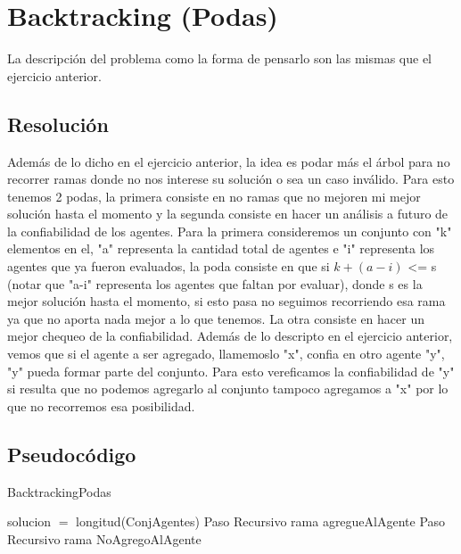 \section{Backtracking (Podas)}

	La descripción del problema como la forma de pensarlo son las mismas que el ejercicio anterior.

\subsection{Resolución}
	
	Además de lo dicho en el ejercicio anterior, la idea es podar más el árbol para no recorrer ramas donde no nos interese su solución o sea un caso inválido. Para esto tenemos 2 podas, la primera consiste en no ramas que no mejoren mi mejor solución hasta el momento y la segunda consiste en hacer un análisis a futuro de la confiabilidad de los agentes. Para la primera consideremos un conjunto con "k" elementos en el, "a" representa la cantidad total de agentes e "i" representa los agentes que ya fueron evaluados, la poda consiste en que si $k+(a-i)$ <= s (notar que "a-i" representa los agentes que faltan por evaluar), donde s es la mejor solución hasta el momento, si esto pasa no seguimos recorriendo esa rama ya que no aporta nada mejor a lo que tenemos. La otra consiste en hacer un mejor chequeo de la confiabilidad. Además de lo descripto en el ejercicio anterior, vemos que si el agente a ser agregado, llamemoslo "x", confia en otro agente "y", "y" pueda formar parte del conjunto.  Para esto vereficamos la confiabilidad de "y" si resulta que no podemos agregarlo al conjunto tampoco agregamos a "x" por lo que no recorremos esa posibilidad. 
	
\subsection{Pseudocódigo}  
	
\begin{algorithm}[H]
\caption{BacktrackingPodas}\label{Ej1.1}

\begin{algorithmic}[H]
\State solucion $=$ longitud(ConjAgentes)
\EndIf
\EndIf
{}
\State Paso Recursivo rama agregueAlAgente
\EndIf
{}
\State Paso Recursivo rama NoAgregoAlAgente
\EndIf
\EndProcedure
\end{algorithmic}

\end{algorithm}

